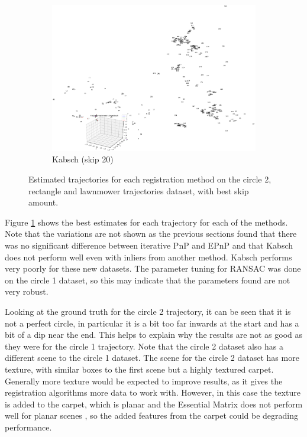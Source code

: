 \documentclass[12pt,a4paper]{article}
\begin{document}
\begin{figure}[p]
\begin{subfigure}[t]{0.3\textwidth}
        \includegraphics[width=\textwidth]{../quad/basic-reg-saves-new-lawnmower/20/atrj_d.pdf}
        \caption{Kabsch (skip 20)}
      \end{subfigure} 
      \caption{Estimated trajectories for each registration method on the circle 2, rectangle and lawnmower trajectories dataset, with best skip amount.}
      \label{f: multi trj}
    \end{figure}
     
    Figure \ref{f: multi trj} shows the best estimates for each trajectory for each of the methods. Note that the variations are not shown as the previous sections found that there was no significant difference between iterative PnP and EPnP and that Kabsch does not perform well even with inliers from another method. Kabsch performs very poorly for these new datasets. The parameter tuning for RANSAC was done on the circle 1 dataset, so this may indicate that the parameters found are not very robust.
     
    Looking at the ground truth for the circle 2 trajectory, it can be seen that it is not a perfect circle, in particular it is a bit too far inwards at the start and has a bit of a dip near the end. This helps to explain why the results are not as good as they were for the circle 1 trajectory. Note that the circle 2 dataset also has a different scene to the circle 1 dataset. The scene for the circle 2 dataset has more texture, with similar boxes to the first scene but a highly textured carpet. Generally more texture would be expected to improve results, as it gives the registration algorithms more data to work with. However, in this case the texture is added to the carpet, which is planar and the Essential Matrix does not perform well for planar scenes \cite{mur2015orb}, so the added features from the carpet could be degrading performance.
     
\end{document}
